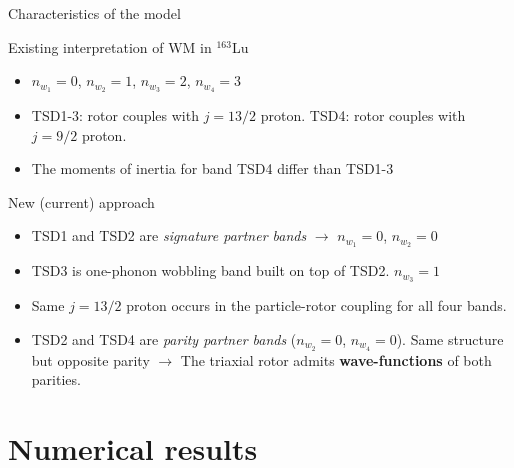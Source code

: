 \documentclass{beamer}
\begin{document}
\begin{frame}{Characteristics of the model}
    \begin{block}{Existing interpretation of WM in $^{163}$Lu}
    \begin{itemize}
        \item $n_{w_1}=0$, $n_{w_2}=1$, $n_{w_3}=2$, $n_{w_4}=3$
        \item TSD1-3: rotor couples with $j=13/2$ proton. TSD4: rotor couples with $j=9/2$ proton.
        \item The moments of inertia for band TSD4 differ than TSD1-3
    \end{itemize}
    \end{block}
    \begin{alertblock}{New (current) approach}
    \begin{itemize}
        \item TSD1 and TSD2 are \emph{signature partner bands} $\to$ $n_{w_1}=0$, $n_{w_2}=0$
        \item TSD3 is one-phonon wobbling band built on top of TSD2. $n_{w_3}=1$
        \item Same $j=13/2$ proton occurs in the particle-rotor coupling for all four bands.
        \item TSD2 and TSD4 are \emph{parity partner bands} ($n_{w_2}=0$, $n_{w_4}=0$). Same structure but opposite parity $\to$ The triaxial rotor admits \textbf{wave-functions} of both parities.
    \end{itemize}
    \end{alertblock}
\end{frame}

\section{Numerical results}
\end{document}
